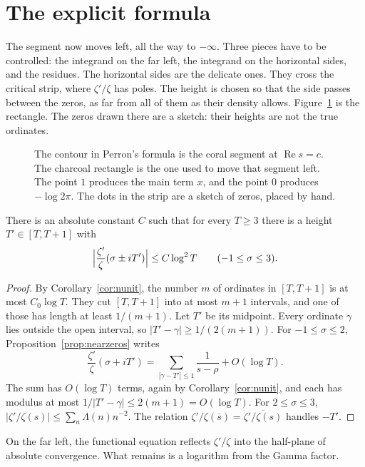 \section{The explicit formula}

The segment now moves left, all the way to $-\infty$. Three pieces have to be controlled: the integrand on the far left, the integrand on the horizontal sides, and the residues. The horizontal sides are the delicate ones. They cross the critical strip, where $\zeta'/\zeta$ has poles. The height is chosen so that the side passes between the zeros, as far from all of them as their density allows. Figure~\ref{fig:perronbox} is the rectangle. The zeros drawn there are a sketch: their heights are not the true ordinates.

\begin{figure}[ht]
\centering
{}
\caption{The contour in Perron's formula is the coral segment at $\operatorname{Re}s=c$. The charcoal rectangle is the one used to move that segment left. The point $1$ produces the main term $x$, and the point $0$ produces $-\log2\pi$. The dots in the strip are a sketch of zeros, placed by hand.}
\label{fig:perronbox}
\end{figure}

\begin{lemma}\label{lem:goodT}
There is an absolute constant $C$ such that for every $T\ge3$ there is a height $T'\in[T,T+1]$ with
\[
\Bigl|\frac{\zeta'}\zeta(\sigma\pm iT')\Bigr|\le C\log^2T\qquad(-1\le\sigma\le3).
\]
\end{lemma}
\begin{proof}
By Corollary~\ref{cor:nunit}, the number $m$ of ordinates in $[T,T+1]$ is at most $C_0\log T$. They cut $[T,T+1]$ into at most $m+1$ intervals, and one of those has length at least $1/(m+1)$. Let $T'$ be its midpoint. Every ordinate $\gamma$ lies outside the open interval, so $|T'-\gamma|\ge1/(2(m+1))$. For $-1\le\sigma\le2$, Proposition~\ref{prop:nearzeros} writes
\[
\frac{\zeta'}\zeta(\sigma+iT')=\sum_{|\gamma-T'|\le1}\frac1{s-\rho}+O(\log T).
\]
The sum has $O(\log T)$ terms, again by Corollary~\ref{cor:nunit}, and each has modulus at most $1/|T'-\gamma|\le2(m+1)=O(\log T)$. For $2\le\sigma\le3$, $|\zeta'/\zeta(s)|\le\sum_n\Lambda(n)n^{-2}$. The relation $\zeta'/\zeta(\overline s)=\overline{\zeta'/\zeta(s)}$ handles $-T'$.
\end{proof}

On the far left, the functional equation reflects $\zeta'/\zeta$ into the half-plane of absolute convergence. What remains is a logarithm from the Gamma factor.

